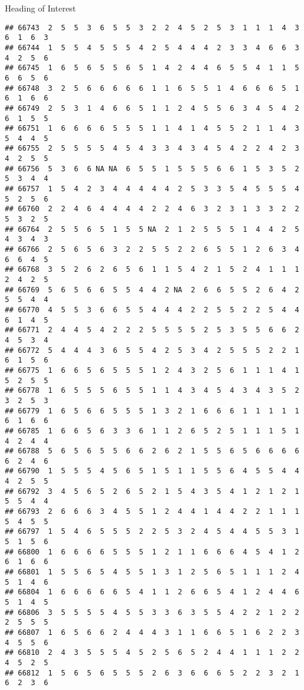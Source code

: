 \documentclass[
  ignorenonframetext,
]{beamer}
\begin{document}
\begin{frame}[fragile]{Heading of Interest}
\begin{verbatim}
## 66743  2  5  5  3  6  5  5  3  2  2  4  5  2  5  3  1  1  1  4  3  6  1  6  3
## 66744  1  5  5  4  5  5  5  4  2  5  4  4  4  2  3  3  4  6  6  3  4  2  5  6
## 66745  1  6  5  6  5  5  6  5  1  4  2  4  4  6  5  5  4  1  1  5  6  6  5  6
## 66748  3  2  5  6  6  6  6  6  1  1  6  5  5  1  4  6  6  6  5  1  6  1  6  6
## 66749  2  5  3  1  4  6  6  5  1  1  2  4  5  5  6  3  4  5  4  2  6  1  5  5
## 66751  1  6  6  6  6  5  5  5  1  1  4  1  4  5  5  2  1  1  4  3  5  4  4  5
## 66755  2  5  5  5  5  4  5  4  3  3  4  3  4  5  4  2  2  4  2  3  4  2  5  5
## 66756  5  3  6  6 NA NA  6  5  5  1  5  5  5  6  6  1  5  3  5  2  5  3  4  4
## 66757  1  5  4  2  3  4  4  4  4  4  2  5  3  3  5  4  5  5  5  4  5  2  5  6
## 66760  2  2  4  6  4  4  4  4  2  2  4  6  3  2  3  1  3  3  2  2  5  3  2  5
## 66764  2  5  5  6  5  1  5  5 NA  2  1  2  5  5  5  1  4  4  2  5  4  3  4  3
## 66766  2  5  6  5  6  3  2  2  5  5  2  2  6  5  5  1  2  6  3  4  6  6  4  5
## 66768  3  5  2  6  2  6  5  6  1  1  5  4  2  1  5  2  4  1  1  1  2  4  2  5
## 66769  5  6  5  6  6  5  5  4  4  2 NA  2  6  6  5  5  2  6  4  2  5  5  4  4
## 66770  4  5  5  3  6  6  5  5  4  4  4  2  2  5  5  2  2  5  4  4  6  1  4  5
## 66771  2  4  4  5  4  2  2  2  5  5  5  5  2  5  3  5  5  6  6  2  4  5  3  4
## 66772  5  4  4  4  3  6  5  5  4  2  5  3  4  2  5  5  5  2  2  1  6  1  5  6
## 66775  1  6  6  5  6  5  5  5  1  2  4  3  2  5  6  1  1  1  4  1  5  2  5  5
## 66778  1  6  5  5  5  6  5  5  1  1  4  3  4  5  4  3  4  3  5  2  3  2  5  3
## 66779  1  6  5  6  6  5  5  5  1  3  2  1  6  6  6  1  1  1  1  1  6  1  6  6
## 66785  1  6  6  5  6  3  3  6  1  1  2  6  5  2  5  1  1  1  5  1  4  2  4  4
## 66788  5  6  5  6  5  5  6  6  2  6  2  1  5  5  6  5  6  6  6  6  6  2  4  6
## 66790  1  5  5  5  4  5  6  5  1  5  1  1  5  5  6  4  5  5  4  4  4  2  5  5
## 66792  3  4  5  6  5  2  6  5  2  1  5  4  3  5  4  1  2  1  2  1  5  5  4  4
## 66793  2  6  6  6  3  4  5  5  1  2  4  4  1  4  4  2  2  1  1  1  5  4  5  5
## 66797  1  5  4  6  5  5  5  2  2  5  3  2  4  5  4  4  5  5  3  1  5  1  5  6
## 66800  1  6  6  6  6  5  5  5  1  2  1  1  6  6  6  4  5  4  1  2  6  1  6  6
## 66801  1  5  5  6  5  4  5  5  1  3  1  2  5  6  5  1  1  1  2  4  5  1  4  6
## 66804  1  6  6  6  6  6  5  4  1  1  2  6  6  5  4  1  2  4  4  6  5  1  4  5
## 66806  3  5  5  5  5  4  5  5  3  3  6  3  5  5  4  2  2  1  2  2  2  5  5  5
## 66807  1  6  5  6  6  2  4  4  4  3  1  1  6  6  5  1  6  2  2  3  4  5  5  6
## 66810  2  4  3  5  5  5  4  5  2  5  6  5  2  4  4  1  1  1  2  2  4  5  2  5
## 66812  1  5  6  5  6  5  5  5  2  6  3  6  6  6  5  2  2  3  2  1  6  2  3  6

\end{verbatim}
\end{frame}
\end{document}
